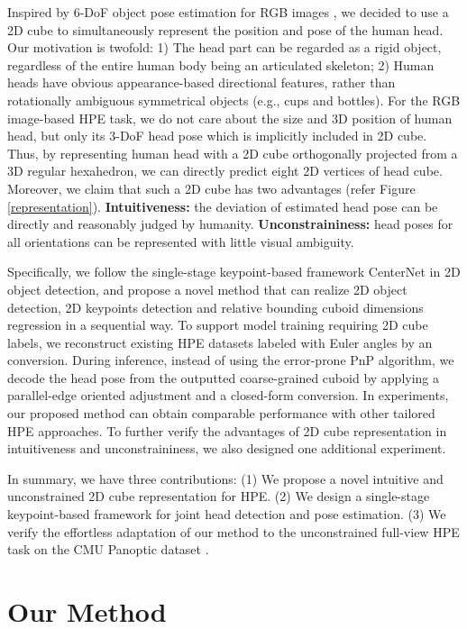 \documentclass{article}
\begin{document}
Inspired by 6-DoF object pose estimation for RGB images \cite{tekin2018real, ahmadyan2021objectron, sun2022onepose}, we decided to use a 2D cube to simultaneously represent the position and pose of the human head. Our motivation is twofold: 1) The head part can be regarded as a rigid object, regardless of the entire human body being an articulated skeleton; 2) Human heads have obvious appearance-based directional features, rather than rotationally ambiguous symmetrical objects (e.g., cups and bottles). For the RGB image-based HPE task, we do not care about the size and 3D position of human head, but only its 3-DoF head pose which is implicitly included in 2D cube. Thus, by representing human head with a 2D cube orthogonally projected from a 3D regular hexahedron, we can directly predict eight 2D vertices of head cube. Moreover, we claim that such a 2D cube has two advantages (refer Figure \ref{representation}). {\bf Intuitiveness:} the deviation of estimated head pose can be directly and reasonably judged by humanity. {\bf Unconstraininess:} head poses for all orientations can be represented with little visual ambiguity. 

Specifically, we follow the single-stage keypoint-based framework CenterNet \cite{zhou2019objects} in 2D object detection, and propose a novel method that can realize 2D object detection, 2D keypoints detection and relative bounding cuboid dimensions regression in a sequential way. To support model training requiring 2D cube labels, we reconstruct existing HPE datasets labeled with Euler angles by an  conversion. During inference, instead of using the error-prone PnP algorithm, we decode the head pose from the outputted coarse-grained cuboid by applying a parallel-edge oriented adjustment and a closed-form  conversion. In experiments, our proposed method can obtain comparable performance with other tailored HPE approaches. To further verify the advantages of 2D cube representation in intuitiveness and unconstraininess, we also designed one additional experiment.

In summary, we have three contributions: (1) We propose a novel intuitive and unconstrained 2D cube representation for HPE. (2) We design a single-stage keypoint-based framework for joint head detection and pose estimation. (3) We verify the effortless adaptation of our method to the unconstrained full-view HPE task on the CMU Panoptic dataset \cite{joo2015panoptic}.



\section{Our Method}
\end{document}
